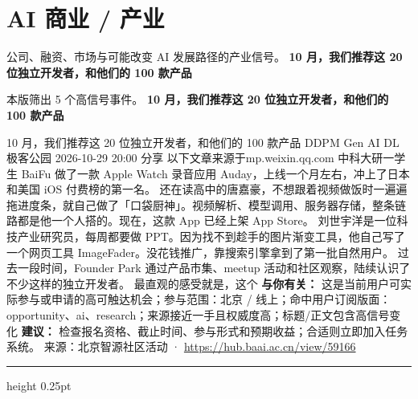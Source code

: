 \documentclass[10.5pt]{ctexart}
\begin{document}
\section*{AI 商业 / 产业}
{\color{ormuted} 公司、融资、市场与可能改变 AI 发展路径的产业信号。}
\vspace{2mm}
{\LARGE\bfseries 10 月，我们推荐这 20 位独立开发者，和他们的 100 款产品}\par
\vspace{1mm}
{\color{ormuted} 本版筛出 5 个高信号事件。}
\vspace{3mm}
{\Large\bfseries 10 月，我们推荐这 20 位独立开发者，和他们的 100 款产品}\par
10 月，我们推荐这 20 位独立开发者，和他们的 100 款产品 DDPM Gen AI DL 极客公园 2026-10-29 20:00 分享 以下文章来源于mp.weixin.qq.com 中科大研一学生 BaiFu 做了一款 Apple Watch 录音应用 Auday，上线一个月左右，冲上了日本和美国 iOS 付费榜的第一名。 还在读高中的唐嘉豪，不想跟着视频做饭时一遍遍拖进度条，就自己做了「口袋厨神」。视频解析、模型调用、服务器存储，整条链路都是他一个人搭的。现在，这款 App 已经上架 App Store。 刘世宇洋是一位科技产业研究员，每周都要做 PPT。因为找不到趁手的图片渐变工具，他自己写了一个网页工具 ImageFader。没花钱推广，靠搜索引擎拿到了第一批自然用户。 过去一段时间，Founder Park 通过产品市集、meetup 活动和社区观察，陆续认识了不少这样的独立开发者。 最直观的感受就是，这个
\textbf{与你有关：} 这是当前用户可实际参与或申请的高可触达机会；参与范围：北京 / 线上；命中用户订阅版面：opportunity、ai、research；来源接近一手且权威度高；标题/正文包含高信号变化
\textbf{建议：} 检查报名资格、截止时间、参与形式和预期收益；合适则立即加入任务系统。
{\footnotesize\color{ormuted} 来源：北京智源社区活动 · \url{https://hub.baai.ac.cn/view/59166}}
\vspace{4mm}
\hrule height 0.25pt
\vspace{3mm}
\end{document}
